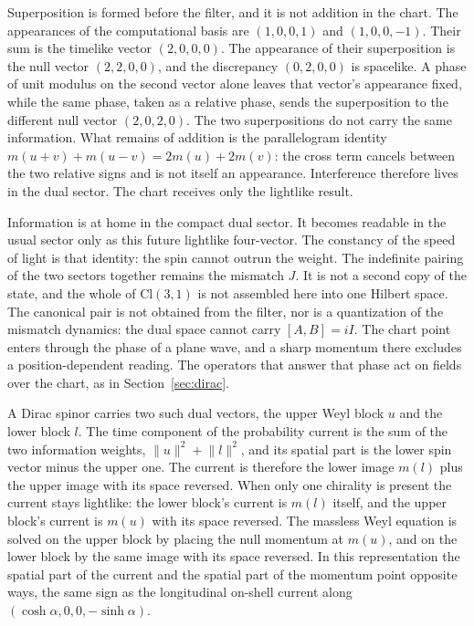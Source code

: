 \documentclass[a4paper]{article}
\begin{document}
Superposition is formed before the filter, and it is not addition in the chart. The appearances of the computational basis are $(1,0,0,1)$ and $(1,0,0,-1)$. Their sum is the timelike vector $(2,0,0,0)$. The appearance of their superposition is the null vector $(2,2,0,0)$, and the discrepancy $(0,2,0,0)$ is spacelike. A phase of unit modulus on the second vector alone leaves that vector's appearance fixed, while the same phase, taken as a relative phase, sends the superposition to the different null vector $(2,0,2,0)$. The two superpositions do not carry the same information. What remains of addition is the parallelogram identity $m(u+v)+m(u-v)=2m(u)+2m(v)$: the cross term cancels between the two relative signs and is not itself an appearance. Interference therefore lives in the dual sector. The chart receives only the lightlike result.

Information is at home in the compact dual sector. It becomes readable in the usual sector only as this future lightlike four-vector. The constancy of the speed of light is that identity: the spin cannot outrun the weight. The indefinite pairing of the two sectors together remains the mismatch $J$. It is not a second copy of the state, and the whole of $\mathrm{Cl}(3,1)$ is not assembled here into one Hilbert space. The canonical pair is not obtained from the filter, nor is a quantization of the mismatch dynamics: the dual space cannot carry $[A,B]=iI$. The chart point enters through the phase of a plane wave, and a sharp momentum there excludes a position-dependent reading. The operators that answer that phase act on fields over the chart, as in Section~\ref{sec:dirac}.

A Dirac spinor carries two such dual vectors, the upper Weyl block $u$ and the lower block $l$. The time component of the probability current is the sum of the two information weights, $\lVert u\rVert^2+\lVert l\rVert^2$, and its spatial part is the lower spin vector minus the upper one. The current is therefore the lower image $m(l)$ plus the upper image with its space reversed. When only one chirality is present the current stays lightlike: the lower block's current is $m(l)$ itself, and the upper block's current is $m(u)$ with its space reversed. The massless Weyl equation is solved on the upper block by placing the null momentum at $m(u)$, and on the lower block by the same image with its space reversed. In this representation the spatial part of the current and the spatial part of the momentum point opposite ways, the same sign as the longitudinal on-shell current along $(\cosh\alpha,0,0,-\sinh\alpha)$.
\end{document}
